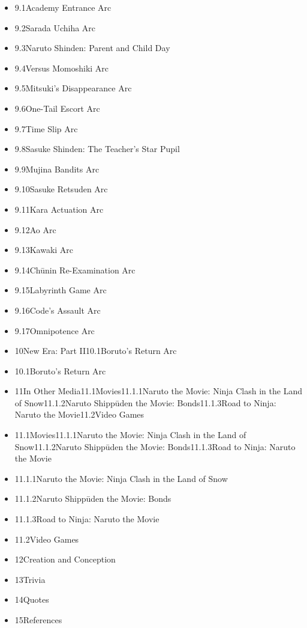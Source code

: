\documentclass[a4paper,12pt]{article}
\begin{document}
\begin{itemize}
\item 9.1Academy Entrance Arc
\item 9.2Sarada Uchiha Arc
\item 9.3Naruto Shinden: Parent and Child Day
\item 9.4Versus Momoshiki Arc
\item 9.5Mitsuki's Disappearance Arc
\item 9.6One-Tail Escort Arc
\item 9.7Time Slip Arc
\item 9.8Sasuke Shinden: The Teacher's Star Pupil
\item 9.9Mujina Bandits Arc
\item 9.10Sasuke Retsuden Arc
\item 9.11Kara Actuation Arc
\item 9.12Ao Arc
\item 9.13Kawaki Arc
\item 9.14Chūnin Re-Examination Arc
\item 9.15Labyrinth Game Arc
\item 9.16Code's Assault Arc
\item 9.17Omnipotence Arc
\item 10New Era: Part II10.1Boruto's Return Arc
\item 10.1Boruto's Return Arc
\item 11In Other Media11.1Movies11.1.1Naruto the Movie: Ninja Clash in the Land of Snow11.1.2Naruto Shippūden the Movie: Bonds11.1.3Road to Ninja: Naruto the Movie11.2Video Games
\item 11.1Movies11.1.1Naruto the Movie: Ninja Clash in the Land of Snow11.1.2Naruto Shippūden the Movie: Bonds11.1.3Road to Ninja: Naruto the Movie
\item 11.1.1Naruto the Movie: Ninja Clash in the Land of Snow
\item 11.1.2Naruto Shippūden the Movie: Bonds
\item 11.1.3Road to Ninja: Naruto the Movie
\item 11.2Video Games
\item 12Creation and Conception
\item 13Trivia
\item 14Quotes
\item 15References
\end{itemize}\\ \par \vspace{0.5cm}
\end{document}
